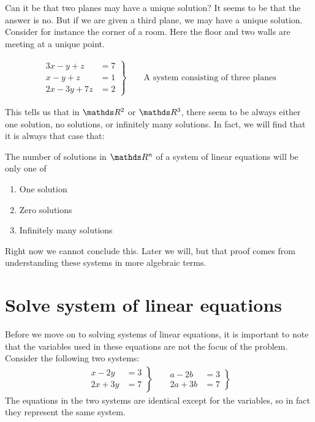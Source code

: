 \documentclass[11pt]{article}
\begin{document}
Can it be that two planes may have a unique solution? It seems to be that the answer is no. But if we are given a third plane, we may have a unique solution. Consider for instance the corner of a room. Here the floor and two walls are meeting at a unique point.

\begin{align*}
\left.
\begin{aligned}
3x - y + z &= 7
\\
x - y + z &= 1
\\
2x - 3y + 7z &= 2
\end{aligned}
\right\}
\qquad
\text{A system consisting of three planes}
\end{align*}


This tells us that in $\bbR^2$ or $\bbR^3$, there seem to be always either one solution, no solutions, or infinitely many solutions. In fact, we will find that it is always that case that:


The number of solutions in $\bbR^n$ of a system of linear equations will be only one of
\begin{enumerate}
\item{
One solution
}
\item{
Zero solutions
}
\item{
Infinitely many solutions
}
\end{enumerate}

Right now we cannot conclude this. Later we will, but that proof comes from understanding these systems in more algebraic terms.

\newpage

\section*{Solve system of linear equations}

Before we move on to solving systems of linear equations, it is important to note that the variables used in these equations are not the focus of the problem. Consider the following two systems:
\begin{align*}
\left.
\begin{aligned}
x - 2y &= 3
\\
2x + 3y &= 7
\end{aligned}
\right\}
&&
\left.
\begin{aligned}
a - 2b &= 3
\\
2a + 3b &= 7
\end{aligned}
\right\}
\end{align*}
The equations in the two systems are identical except for the variables, so in fact they represent the same system.
\end{document}
